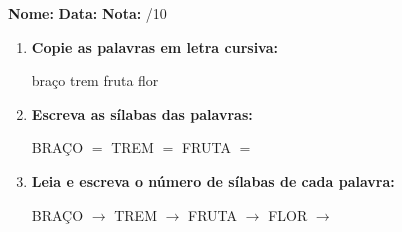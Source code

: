 \begin{exercicio}



\noindent\textbf{Nome:} \underline{\hspace{3.2cm}} \quad \textbf{Data:} \underline{\hspace{1.6cm}} \quad \textbf{Nota:} \underline{\hspace{0.9cm}}/10


\begin{enumerate}

  \item \textbf{Copie as palavras em letra cursiva:}
  \begin{center}
  braço \quad trem \quad fruta \quad flor
  \end{center}
  \begin{center}
  \underline{\hspace{2.4cm}} \quad \underline{\hspace{2.4cm}} \quad \underline{\hspace{2.4cm}} \quad \underline{\hspace{2.4cm}}
  \end{center}

  \item \textbf{Escreva as sílabas das palavras:}
  \begin{center}
  BRAÇO $=$ \underline{\hspace{1.5cm}} \underline{\hspace{1.5cm}} \quad TREM $=$ \underline{\hspace{1.5cm}} \underline{\hspace{1.5cm}} \quad FRUTA $=$ \underline{\hspace{1.5cm}} \underline{\hspace{1.5cm}}
  \end{center}

  \item \textbf{Leia e escreva o número de sílabas de cada palavra:}
  \begin{center}
  BRAÇO $\rightarrow$ \underline{\hspace{0.9cm}} \quad TREM $\rightarrow$ \underline{\hspace{0.9cm}} \quad FRUTA $\rightarrow$ \underline{\hspace{0.9cm}} \quad FLOR $\rightarrow$ \underline{\hspace{0.9cm}}
  \end{center}


\end{enumerate}
\end{exercicio}
